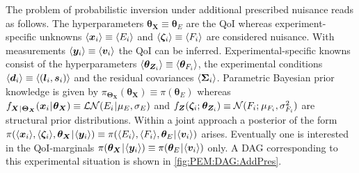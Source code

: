 The problem of probabilistic inversion under additional prescribed nuisance reads as follows.
The hyperparameters \(\bm{\theta}_{\bm{X}} \equiv \bm{\theta}_E\) are the QoI
whereas experiment-specific unknowns \(\langle{\bm{x}_i}\rangle \equiv \langle{E_i}\rangle\) and \(\langle{\bm{\zeta}_i}\rangle \equiv \langle{F_i}\rangle\) are considered nuisance.
With measurements \(\langle{\bm{y}_i}\rangle \equiv \langle{\bm{v}_i}\rangle\) the QoI can be inferred.
Experimental-specific knowns consist of the hyperparameters \(\langle{\bm{\theta}_{\bm{Z}_i}}\rangle \equiv \langle{\bm{\theta}_{F_i}}\rangle\),
the experimental conditions \(\langle{\bm{d}_i}\rangle \equiv \langle{(\bm{l}_i,\bm{s}_i)}\rangle\) and the residual covariances \(\langle{\bm{\Sigma}_i}\rangle\).
Parametric Bayesian prior knowledge is given by \(\pi_{\bm{\Theta}_{\bm{X}}}(\bm{\theta}_{\bm{X}}) \equiv \pi(\bm{\theta}_E)\)
whereas \(f_{\bm{X} {\:\!}|{\:\!} \bm{\Theta}_{\bm{X}}} (\bm{x}_i {\:\!}|{\:\!} \bm{\theta}_{\bm{X}}) \equiv \mathcal{LN}(E_i {\:\!}|{\:\!} \mu_E,\sigma_E)\) and 
\(f_{\bm{Z}}(\bm{\zeta}_i ;{\:\!} \bm{\theta}_{\bm{Z}_i}) \equiv \mathcal{N}(F_i ;{\:\!} \mu_{F_i},\sigma_{F_i}^2)\) are structural prior distributions.
Within a joint approach a posterior of the form \(\pi( \langle{\bm{x}_i}\rangle,\langle{\bm{\zeta}_i}\rangle,\bm{\theta}_{\bm{X}} {\:\!}|{\:\!} \langle{\bm{y}_i}\rangle) \equiv \pi( \langle{E_i}\rangle,\langle{F_i}\rangle,\bm{\theta}_E {\:\!}|{\:\!} \langle{\bm{v}_i}\rangle)\) arises.
Eventually one is interested in the QoI-marginals \( \pi(\bm{\theta}_{\bm{X}} {\:\!}|{\:\!} \langle{\bm{y}_i}\rangle) \equiv \pi(\bm{\theta}_E {\:\!}|{\:\!} \langle{\bm{v}_i}\rangle)\) only.
A DAG corresponding to this experimental situation is shown in \cref{fig:PEM:DAG:AddPres}.

